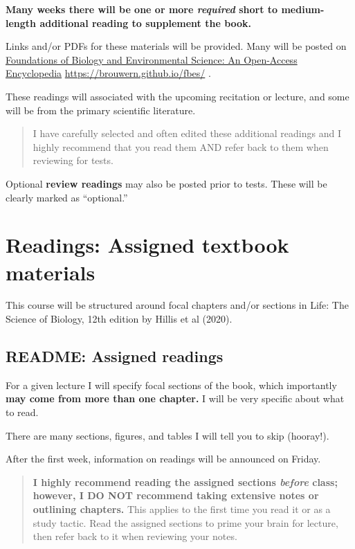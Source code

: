 \documentclass[
]{book}
\begin{document}
\textbf{Many weeks there will be one or more \emph{required} short to medium-length additional reading to supplement the book. }

Links and/or PDFs for these materials will be provided. Many will be posted on \href{https://brouwern.github.io/fbes/}{Foundations of Biology and Environmental Science: An Open-Access Encyclopedia} \url{https://brouwern.github.io/fbes/} .

These readings will associated with the upcoming recitation or lecture, and some will be from the primary scientific literature.

\begin{quote}
I have carefully selected and often edited these additional readings and I highly recommend that you read them AND refer back to them when reviewing for tests.
\end{quote}

Optional \textbf{review readings} may also be posted prior to tests. These will be clearly marked as ``optional.''

\hypertarget{textbook}{%
\chapter{Readings: Assigned textbook materials}\label{textbook}}

This course will be structured around focal chapters and/or sections in Life: The Science of Biology, 12th edition by Hillis et al (2020).

\hypertarget{readme-assigned-readings}{%
\section{README: Assigned readings}\label{readme-assigned-readings}}

For a given lecture I will specify focal sections of the book, which importantly \textbf{may come from more than one chapter.} I will be very specific about what to read.

There are many sections, figures, and tables I will tell you to skip (hooray!).

After the first week, information on readings will be announced on Friday.

\begin{quote}
\textbf{I highly recommend reading the assigned sections \emph{before} class; however, I DO NOT recommend taking extensive notes or outlining chapters.} This applies to the first time you read it or as a study tactic. Read the assigned sections to prime your brain for lecture, then refer back to it when reviewing your notes.
\end{quote}
\end{document}
